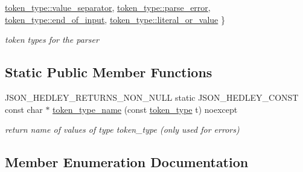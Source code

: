 \begin{DoxyCompactItemize}
\hyperlink{classnlohmann_1_1detail_1_1lexer__base_aa3538cce439a2de6c7893e627b38c454a745373036100d7392ad62c617cab59af}{token\+\_\+type\+::value\+\_\+separator}, 
\hyperlink{classnlohmann_1_1detail_1_1lexer__base_aa3538cce439a2de6c7893e627b38c454a456e19aeafa334241c7ff3f589547f9d}{token\+\_\+type\+::parse\+\_\+error}, 
\hyperlink{classnlohmann_1_1detail_1_1lexer__base_aa3538cce439a2de6c7893e627b38c454aca11f56dd477c09e06583dbdcda0985f}{token\+\_\+type\+::end\+\_\+of\+\_\+input}, 
\newline
\hyperlink{classnlohmann_1_1detail_1_1lexer__base_aa3538cce439a2de6c7893e627b38c454ad2a8e6f6721cccec0b466301dd9495a5}{token\+\_\+type\+::literal\+\_\+or\+\_\+value}
 \}\begin{DoxyCompactList}\small\item\em token types for the parser \end{DoxyCompactList}
\end{DoxyCompactItemize}
\subsection*{Static Public Member Functions}
\begin{DoxyCompactItemize}
\item 
\mbox{\label{classnlohmann_1_1detail_1_1lexer__base_ad214d59300605f9d3a4a32c8917aa608}} 
J\+S\+O\+N\+\_\+\+H\+E\+D\+L\+E\+Y\+\_\+\+R\+E\+T\+U\+R\+N\+S\+\_\+\+N\+O\+N\+\_\+\+N\+U\+LL static J\+S\+O\+N\+\_\+\+H\+E\+D\+L\+E\+Y\+\_\+\+C\+O\+N\+ST const char $\ast$ \hyperlink{classnlohmann_1_1detail_1_1lexer__base_ad214d59300605f9d3a4a32c8917aa608}{token\+\_\+type\+\_\+name} (const \hyperlink{classnlohmann_1_1detail_1_1lexer__base_aa3538cce439a2de6c7893e627b38c454}{token\+\_\+type} t) noexcept
\begin{DoxyCompactList}\small\item\em return name of values of type token\+\_\+type (only used for errors) \end{DoxyCompactList}\end{DoxyCompactItemize}


\subsection{Member Enumeration Documentation}
\mbox{\label{classnlohmann_1_1detail_1_1lexer__base_aa3538cce439a2de6c7893e627b38c454}} 
